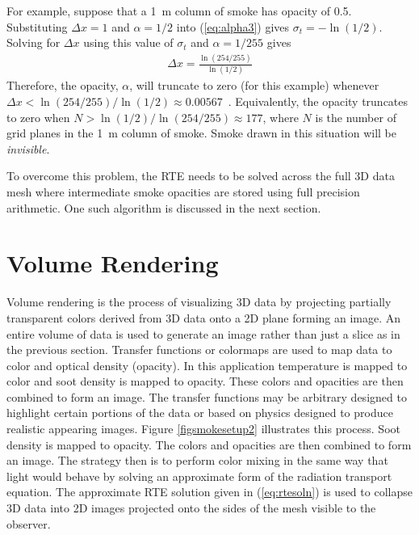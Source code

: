 {For example, suppose that a 1~m column of smoke has opacity of 0.5.  Substituting $\Delta x=1$ and $\alpha=1/2$ into (\ref{eq:alpha3}) gives $\sigma_t=-\ln(1/2)$.  Solving for $\Delta x$ using this value of $\sigma_t$ and $\alpha=1/255$ gives
\begin{eqnarray}
\Delta x = \frac{\ln(254/255)}{\ln(1/2)}
\end{eqnarray}
Therefore, the opacity, $\alpha$, will truncate to zero (for this example) whenever $\Delta x<\ln(254/255)/\ln(1/2)\approx 0.00567$~.  Equivalently, the opacity truncates to zero when $N>\ln(1/2)/\ln(254/255)\approx 177$, where $N$ is the number of grid planes in the 1~m column of smoke.  Smoke drawn in this situation will be {\em invisible}.

To overcome this problem, the RTE needs to be solved across the full 3D data mesh where intermediate smoke opacities are stored using full precision arithmetic.  One such algorithm is discussed in the next section.


\section{Volume Rendering}
Volume rendering is the process of visualizing 3D data by projecting partially transparent colors derived from 3D data onto a 2D plane forming an image.  An entire volume of data is used to generate an image rather than just a slice as in the previous section.  Transfer functions or colormaps are used to map data to color and optical density (opacity).  In this application temperature is mapped to color and soot density is mapped to opacity.  These colors and opacities are then combined to form an image.  The transfer functions may be arbitrary designed to highlight certain portions of the data or based on physics designed to produce realistic appearing images.  Figure \ref{figsmokesetup2} illustrates this process.
Soot density is mapped to opacity.  The colors and opacities are then combined to form an image.  The strategy then is to perform color mixing in the same way that light would behave by solving an approximate form of the radiation transport equation.  The approximate RTE solution given in (\ref{eq:rtesoln})  is used to collapse 3D data into 2D images projected onto the sides of the mesh visible to the observer.

}
